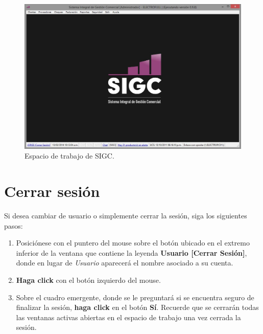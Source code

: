 \documentclass{book}
\begin{document}
\begin{figure}[H]
	\centering
	\includegraphics[width=1.0\textwidth]{images/ventanas/ventana-02.jpg}
	\medskip
	\caption{Espacio de trabajo de SIGC.}
\end{figure}
\bigskip



\section{Cerrar sesión}

Si desea cambiar de usuario o simplemente cerrar la sesión, siga los siguientes pasos:
\medskip

\begin{enumerate}
	\itemsep=8pt \topsep=0pt \partopsep=0pt \parskip=0pt \parsep=0pt
	
	\item Posiciónese con el puntero del mouse sobre el botón ubicado en el extremo inferior de la ventana que contiene la leyenda \textbf{Usuario [Cerrar Sesión]}, donde en lugar de \textit{Usuario} aparecerá el nombre asociado a su cuenta.

	\item \textbf{Haga click} con el botón izquierdo del mouse.

	\item Sobre el cuadro emergente, donde se le preguntará si se encuentra seguro de finalizar la sesión, \textbf{haga click} en el botón \textbf{Sí}. Recuerde que se cerrarán todas las ventanas activas abiertas en el espacio de trabajo una vez cerrada la sesión.

\end{enumerate}
\medskip
\end{document}
